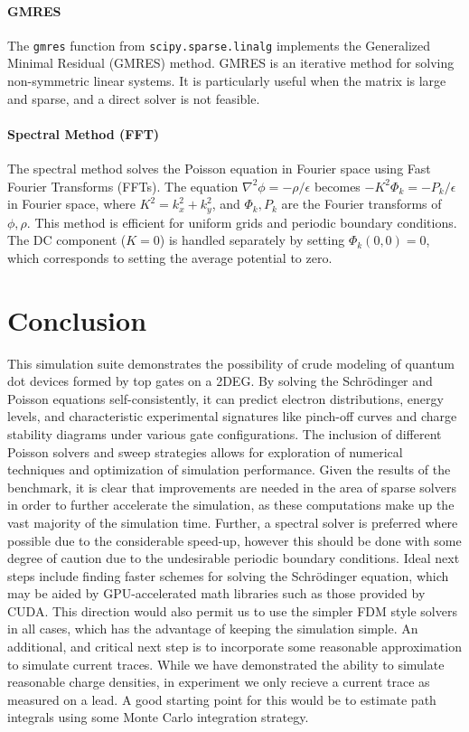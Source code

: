 \documentclass{article}
\begin{document}
\paragraph{GMRES}
The \texttt{gmres} function from \texttt{scipy.sparse.linalg} implements the Generalized Minimal Residual (GMRES) method. GMRES is an iterative method for solving non-symmetric linear systems. It is particularly useful when the matrix is large and sparse, and a direct solver is not feasible.

\paragraph{Spectral Method (FFT)}
The spectral method solves the Poisson equation in Fourier space using Fast Fourier Transforms (FFTs). The equation \(\nabla^2 \phi = -\rho/\epsilon\) becomes \(-K^2 \Phi_k = -P_k/\epsilon\) in Fourier space, where \(K^2 = k_x^2 + k_y^2\), and \(\Phi_k, P_k\) are the Fourier transforms of \(\phi, \rho\). This method is efficient for uniform grids and periodic boundary conditions. The DC component (\(K=0\)) is handled separately by setting \(\Phi_k(0,0)=0\), which corresponds to setting the average potential to zero.

\section{Conclusion}
This simulation suite demonstrates the possibility of crude modeling of quantum dot devices formed by top gates on a 2DEG. By solving the Schrödinger and Poisson equations self-consistently, it can predict electron distributions, energy levels, and characteristic experimental signatures like pinch-off curves and charge stability diagrams under various gate configurations. The inclusion of different Poisson solvers and sweep strategies allows for exploration of numerical techniques and optimization of simulation performance. Given the results of the benchmark, it is clear that improvements are needed in the area of sparse solvers in order to further accelerate the simulation, as these computations make up the vast majority of the simulation time. Further, a spectral solver is preferred where possible due to the considerable speed-up, however this should be done with some degree of caution due to the undesirable periodic boundary conditions. Ideal next steps include finding faster schemes for solving the Schrödinger equation, which may be aided by GPU-accelerated math libraries such as those provided by CUDA. This direction would also permit us to use the simpler FDM style solvers in all cases, which has the advantage of keeping the simulation simple. An additional, and critical next step is to incorporate some reasonable approximation to simulate current traces. While we have demonstrated the ability to simulate reasonable charge densities, in experiment we only recieve a current trace as measured on a lead. A good starting point for this would be to estimate path integrals using some Monte Carlo integration strategy.
\end{document}
